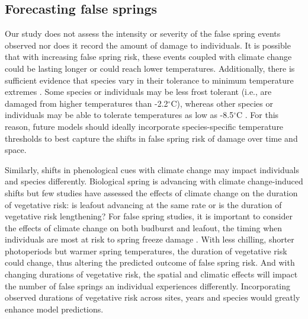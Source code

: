 \documentclass{article}\usepackage[]{graphicx}\usepackage[]{color}
\begin{document}
\subsection*{Forecasting false springs}
Our study does not assess the intensity or severity of the false spring events observed nor does it record the amount of damage to individuals. It is possible that with increasing false spring risk, these events coupled with climate change could be lasting longer or could reach lower temperatures. Additionally, there is sufficient evidence that species vary in their tolerance to minimum temperature extremes \citep{Korner2016, Lenz2013, Zhuo2018,bennett2018globtherm}. Some species or individuals may be less frost tolerant (i.e., are damaged from higher temperatures than -2.2$^{\circ}$C), whereas other species or individuals may be able to tolerate temperatures as low as -8.5$^{\circ}$C \citep{Lenz2016}. %
For this reason, future models should ideally incorporate species-specific temperature thresholds to best capture the shifts in false spring risk of damage over time and space. 

Similarly, shifts in phenological cues with climate change may impact individuals and species differently. Biological spring is advancing with climate change-induced shifts but few studies have assessed the effects of climate change on the duration of vegetative risk: is leafout advancing at the same rate or is the duration of vegetative risk lengthening? For false spring studies, it is important to consider the effects of climate change on both budburst and leafout, the timing when individuals are most at risk to spring freeze damage \citep{Chamberlain2019,Lenz2016}. With less chilling, shorter photoperiods but warmer spring temperatures, the duration of vegetative risk could change, thus altering the predicted outcome of false spring risk. And with changing durations of vegetative risk, the spatial and climatic effects will impact the number of false springs an individual experiences differently. Incorporating observed durations of vegetative risk across sites, years and species would greatly enhance model predictions. 
\end{document}
